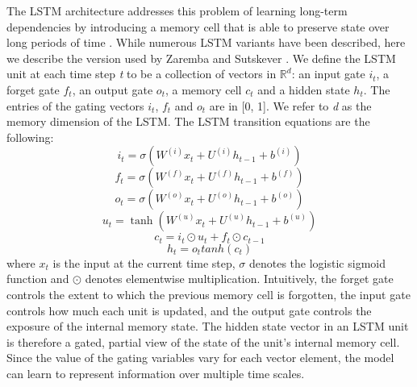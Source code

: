 \documentclass[letterpaper]{article}
\begin{document}
The LSTM architecture addresses this problem of learning long-term dependencies by introducing a memory cell that is able to preserve state over long periods of time \cite{Hochreiter:1997:LSM:1246443.1246450}. While numerous LSTM variants have been described, here we describe the version used by Zaremba and Sutskever . We define the LSTM unit at each time step \textit{t} to be a collection of vectors in $\mathbb{R}^{d}$: an input gate \textit{$i_{t}$}, a forget gate \textit{$f_{t}$}, an output gate \textit{$o_{t}$}, a memory cell \textit{$c_{t}$} and a hidden state \textit{$h_{t}$}. The entries of the gating vectors \textit{$i_{t}$}, \textit{$f_{t}$} and \textit{$o_{t}$} are in [0, 1]. We refer to \textit{d} as the memory dimension of the LSTM. The LSTM transition equations are the following:
\begin{equation}\label{lstm-i}
i_{t} = \sigma(W^{(i)}x_{t}+U^{(i)}h_{t-1}+b^{(i)})
\end{equation}
\begin{equation}\label{lstm-f}
f_{t} = \sigma(W^{(f)}x_{t}+U^{(f)}h_{t-1}+b^{(f)})
\end{equation}
\begin{equation}\label{lstm-o}
o_{t} = \sigma(W^{(o)}x_{t}+U^{(o)}h_{t-1}+b^{(o)})
\end{equation}
\begin{equation}\label{lstm-u}
u_{t} = \tanh(W^{(u)}x_{t}+U^{(u)}h_{t-1}+b^{(u)})
\end{equation}
\begin{equation}\label{lstm-c}
c_{t} = i_{t} \odot u_{t} + f_{t} \odot c_{t-1}
\end{equation}
\begin{equation}\label{lstm-h}
h_{t} = o_{t} tanh(c_{t})
\end{equation}
where \textit{$x_{t}$} is the input at the current time step, $\sigma$ denotes the logistic sigmoid function and $\odot$ denotes elementwise multiplication. Intuitively, the forget gate controls the extent to which the previous memory cell is forgotten, the input gate controls how much each unit is updated, and the output gate controls the exposure of the internal memory state. The hidden state vector in an LSTM unit is therefore a gated, partial view of the state of the unit's internal memory cell. Since the value of the gating variables vary for each vector element, the model can learn to represent information over multiple time scales.
\end{document}
